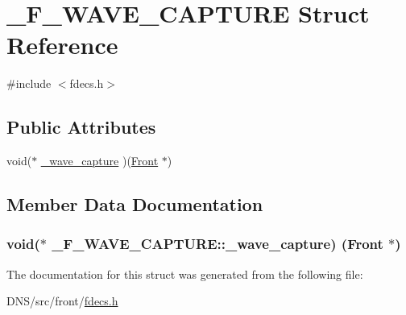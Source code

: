 \hypertarget{struct___f___w_a_v_e___c_a_p_t_u_r_e}{}\section{\+\_\+\+F\+\_\+\+W\+A\+V\+E\+\_\+\+C\+A\+P\+T\+U\+RE Struct Reference}
\label{struct___f___w_a_v_e___c_a_p_t_u_r_e}


{\ttfamily \#include $<$fdecs.\+h$>$}

\subsection*{Public Attributes}
\begin{DoxyCompactItemize}
\item 
void($\ast$ \hyperlink{struct___f___w_a_v_e___c_a_p_t_u_r_e_a97e978f272c9c488d35cb2f323f6c7c9}{\+\_\+wave\+\_\+capture} )(\hyperlink{fdecs_8h_ac32202b798f848095c489cfd04c4ca5f}{Front} $\ast$)
\end{DoxyCompactItemize}


\subsection{Member Data Documentation}
\subsubsection[{\texorpdfstring{\+\_\+wave\+\_\+capture}{_wave_capture}}]{\setlength{\rightskip}{0pt plus 5cm}void($\ast$ \+\_\+\+F\+\_\+\+W\+A\+V\+E\+\_\+\+C\+A\+P\+T\+U\+R\+E\+::\+\_\+wave\+\_\+capture) ({\bf Front} $\ast$)}\hypertarget{struct___f___w_a_v_e___c_a_p_t_u_r_e_a97e978f272c9c488d35cb2f323f6c7c9}{}\label{struct___f___w_a_v_e___c_a_p_t_u_r_e_a97e978f272c9c488d35cb2f323f6c7c9}


The documentation for this struct was generated from the following file\+:\begin{DoxyCompactItemize}
\item 
D\+N\+S/src/front/\hyperlink{fdecs_8h}{fdecs.\+h}\end{DoxyCompactItemize}
